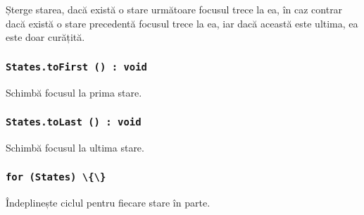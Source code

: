 Șterge starea, dacă există o stare următoare focusul trece la ea, în caz contrar dacă există o stare precedentă focusul trece la ea, iar dacă această este ultima, ea este doar curățită.

\subsubsection{\lstinline|States.toFirst () : void|}

Schimbă focusul la prima stare.

\subsubsection{\lstinline|States.toLast () : void|}

Schimbă focusul la ultima stare.

\subsubsection{\lstinline|for (States) \{\}|}

Îndeplinește ciclul pentru fiecare stare în parte.

